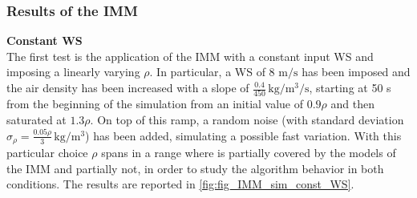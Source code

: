 \subsubsection{Results of the IMM} 
\textbf{Constant WS}\\
The first test is the application of the IMM with a constant input WS and imposing a linearly varying $\rho$. In particular, a WS of 8 $\si{\meter\per\second}$ has been imposed and the air density has been increased with a slope of $\frac{0.4}{450} \, \si{\kilo\gram\per\cubic\meter\per\second}$, starting at 50 s from the beginning of the simulation from an initial value of $0.9\rho$ and then saturated at $1.3\rho$. On top of this ramp, a random noise (with standard deviation $\sigma_{\rho}=\frac{0.05\rho}{3} \, \si{\kilo\gram\per\cubic\meter}$) has been added, simulating a possible fast variation. With this particular choice $\rho$ spans in a range where is partially covered by the models of the IMM and partially not, in order to study the algorithm behavior in both conditions. The results are reported in \autoref{fig:fig_IMM_sim_const_WS}.

